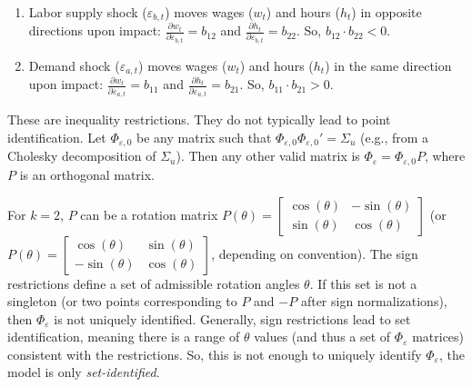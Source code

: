 \documentclass[a4paper,12pt]{article} %
\theoremstyle{nonitalic}
\newenvironment{solution}[1]
  {\renewcommand\theinnercustomsol{#1}%
   \innercustomsol}
  {\endinnercustomsol}
\newcounter{solutionctr}[section]
\renewcommand{\thesolutionctr}{(\alph{solutionctr})}
\newenvironment{autosolution}
  {\refstepcounter{solutionctr}%
   \begin{solution}{\thesolutionctr}}
  {\end{solution}}
\begin{document}
\begin{autosolution}
    \

    \begin{enumerate}
        \item Labor supply shock ($\varepsilon_{b,t}$) moves wages ($w_t$) and hours ($h_t$) in opposite directions upon impact:
        $\frac{\partial w_t}{\partial \varepsilon_{b,t}} = b_{12}$ and $\frac{\partial h_t}{\partial \varepsilon_{b,t}} = b_{22}$.
        So, $b_{12} \cdot b_{22} < 0$.
        \item Demand shock ($\varepsilon_{a,t}$) moves wages ($w_t$) and hours ($h_t$) in the same direction upon impact:
        $\frac{\partial w_t}{\partial \varepsilon_{a,t}} = b_{11}$ and $\frac{\partial h_t}{\partial \varepsilon_{a,t}} = b_{21}$.
        So, $b_{11} \cdot b_{21} > 0$.
    \end{enumerate}
    These are inequality restrictions. They do not typically lead to point identification.
    Let $\Phi_{\varepsilon,0}$ be any matrix such that $\Phi_{\varepsilon,0} \Phi_{\varepsilon,0}' = \Sigma_u$ (e.g., from a Cholesky decomposition of $\Sigma_u$).
    Then any other valid matrix is $\Phi_{\varepsilon} = \Phi_{\varepsilon,0} P$, where $P$ is an orthogonal matrix.
    
    For $k=2$, $P$ can be a rotation matrix $P(\theta) = \begin{bmatrix} \cos(\theta) & -\sin(\theta) \\ \sin(\theta) & \cos(\theta) \end{bmatrix}$
    (or $P(\theta) = \begin{bmatrix} \cos(\theta) & \sin(\theta) \\ -\sin(\theta) & \cos(\theta) \end{bmatrix}$, depending on convention).
    The sign restrictions define a set of admissible rotation angles $\theta$.
    If this set is not a singleton (or two points corresponding to $P$ and $-P$ after sign normalizations),
    then $\Phi_{\varepsilon}$ is not uniquely identified. Generally, sign restrictions lead to set identification,
    meaning there is a range of $\theta$ values (and thus a set of $\Phi_{\varepsilon}$ matrices) consistent with the restrictions.
    So, this is not enough to uniquely identify $\Phi_{\varepsilon}$, the model is only \emph{set-identified}.
\end{autosolution}
\end{document}
